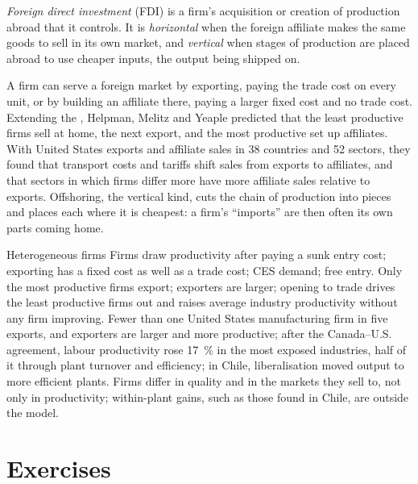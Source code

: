 \begin{definition}\label{def:b3:scale-variety-firms:fdi}
\emph{Foreign direct investment} (FDI) is a firm's acquisition or creation of
production abroad that it controls. It is \emph{horizontal} when the foreign
affiliate makes the same goods to sell in its own market, and \emph{vertical}
when stages of production are placed abroad to use cheaper inputs, the output
being shipped on.
\end{definition}

A firm can serve a foreign market by exporting, paying the trade cost on every
unit, or by building an affiliate there, paying a larger fixed cost and no
trade cost. Extending the , Helpman, Melitz and Yeaple
predicted that the least productive firms sell at home, the next export, and the
most productive set up affiliates. With United States exports and affiliate
sales in 38 countries and 52 sectors, they found that transport costs and tariffs
shift sales from exports to affiliates, and that sectors in which firms differ
more have more affiliate sales relative to exports. %
Offshoring, the vertical kind, cuts the chain of production into pieces and
places each where it is cheapest: a firm's ``imports'' are then often its own
parts coming home.

\begin{model}{Heterogeneous firms}
\assumes Firms draw productivity after paying a sunk entry cost; exporting has a
fixed cost as well as a trade cost; CES demand; free entry.
\predicts Only the most productive firms export; exporters are larger;
opening to trade drives the least productive firms out and raises average
industry productivity without any firm improving.
\tested Fewer than one United States manufacturing firm in five exports, and
exporters are larger and more productive; after the Canada--U.S. agreement,
labour productivity rose 17~\% in the most exposed industries, half of it through
plant turnover and efficiency; in Chile, liberalisation moved output to more
efficient plants. %
\breaks Firms differ in quality and in the markets they sell to, not only in
productivity; within-plant gains, such as those found in Chile, are outside the
model.
\end{model}

\section{Exercises}\label{sec:b3:scale-variety-firms:exercises}

